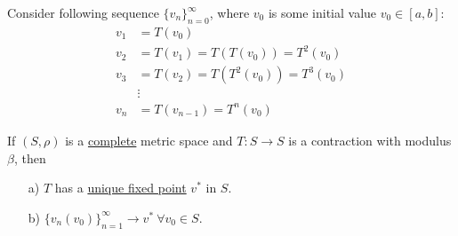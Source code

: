\documentclass[twoside]{article}
\begin{document}
Consider following sequence $\{v_{n}\}_{n=0}^{\infty}$, where $v_{0}$ is some initial value $v_{0} \in [a, b]$:
\[
\begin{array}{ll}
    v_{1} &= T(v_{0})\\
    v_{2} &= T(v_{1}) = T(T(v_{0})) = T^{2}(v_{0})\\
    v_{3} &= T(v_{2}) = T(T^{2}(v_{0})) = T^{3}(v_{0})\\
          &\vdots \\
    v_{n} &= T(v_{n-1}) = T^{n}(v_{0})
\end{array}
\]

\begin{theorem}
    If $(S, \rho)$ is a \underline{complete} metric space and $T:S \to S$ is a contraction with modulus $\beta$, then
    \begin{enumerate}
        \item [a)] $T$ has a \underline{unique fixed point} $v^{*}$ in $S$.
        \item [b)] $\{v_{n}(v_{0})\}_{n=1}^{\infty} \to v^{*} ~ \forall v_{0} \in S$. 
    \end{enumerate}
\end{theorem}
\end{document}
